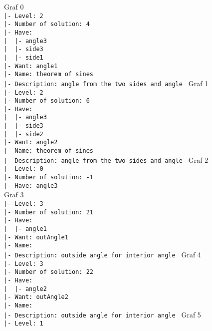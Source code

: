 \documentclass[12pt,a4paper]{article}
\begin{document}
Graf 0\\
\verb'|- Level: 2'\\
\verb'|- Number of solution: 4'\\
\verb'|- Have: '\\
\verb'|  |- angle3 '\\
\verb'|  |- side3 '\\
\verb'|  |- side1 '\\
\verb'|- Want: angle1 '\\
\verb'|- Name: theorem of sines '\\
\verb'|- Description: angle from the two sides and angle '
Graf 1\\
\verb'|- Level: 2'\\
\verb'|- Number of solution: 6'\\
\verb'|- Have: '\\
\verb'|  |- angle3 '\\
\verb'|  |- side3 '\\
\verb'|  |- side2 '\\
\verb'|- Want: angle2 '\\
\verb'|- Name: theorem of sines '\\
\verb'|- Description: angle from the two sides and angle '
Graf 2\\
\verb'|- Level: 0'\\
\verb'|- Number of solution: -1'\\
\verb'|- Have: angle3'\\
Graf 3\\
\verb'|- Level: 3'\\
\verb'|- Number of solution: 21'\\
\verb'|- Have: '\\
\verb'|  |- angle1 '\\
\verb'|- Want: outAngle1 '\\
\verb'|- Name:  '\\
\verb'|- Description: outside angle for interior angle '
Graf 4\\
\verb'|- Level: 3'\\
\verb'|- Number of solution: 22'\\
\verb'|- Have: '\\
\verb'|  |- angle2 '\\
\verb'|- Want: outAngle2 '\\
\verb'|- Name:  '\\
\verb'|- Description: outside angle for interior angle '
Graf 5\\
\verb'|- Level: 1'\\
\end{document}

